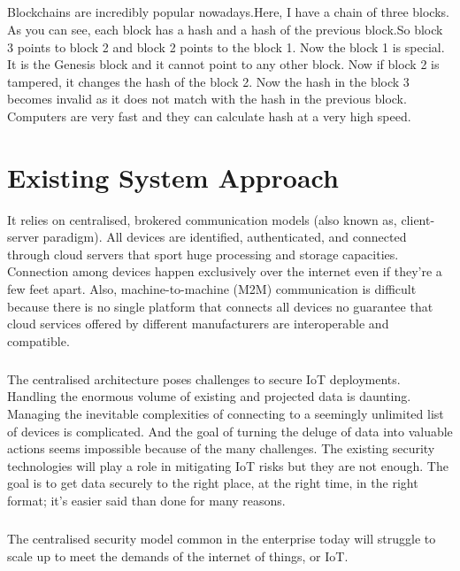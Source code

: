 \paragraph{}Blockchains are incredibly popular nowadays.Here, I have a chain of three blocks. As you can
see, each block has a hash and a hash of the previous block.So block 3 points to block 2 and
block 2 points to the block 1. Now the block 1 is special. It is the Genesis block and it cannot
point to any other block. Now if block 2 is tampered, it changes the hash of the block 2. Now
the hash in the block 3 becomes invalid as it does not match with the hash in the previous block.
Computers are very fast and they can calculate hash at a very high speed.
\chapter{Existing System Approach}
It relies on centralised, brokered communication models (also known as, client-server paradigm). All devices are identified, authenticated, and connected through cloud servers that sport huge processing and storage capacities. Connection among devices happen exclusively over the internet even if they’re a few feet apart. Also, machine-to-machine (M2M) communication is difficult because there is no single platform that connects all devices no guarantee that cloud services offered by different manufacturers are interoperable and compatible.

\paragraph{}The centralised architecture poses challenges to secure IoT deployments. Handling the enormous volume of existing and projected data is daunting. Managing the inevitable complexities of connecting to a seemingly unlimited list of devices is complicated. And the goal of turning the deluge of data into valuable actions seems impossible because of the many challenges. The existing security technologies will play a role in mitigating IoT risks but they are not enough. The goal is to get data securely to the right place, at the right time, in the right format; it’s easier said than done for many reasons.

\paragraph{}The centralised security model common in the enterprise today will struggle to scale up to meet the demands of the internet of things, or IoT.
